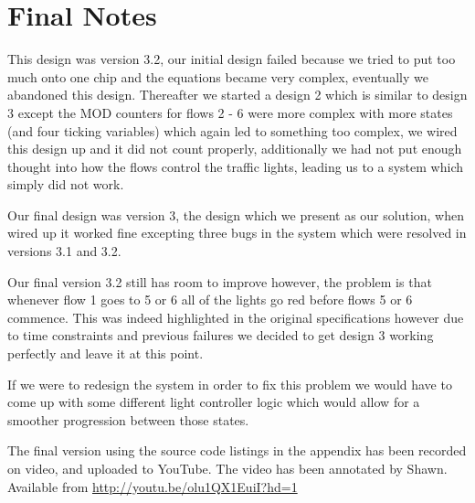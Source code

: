 \section{Final Notes}
This design was version 3.2, our initial design failed because we tried to put
too much onto one chip and the equations became very complex, eventually we
abandoned this design. Thereafter we started a design 2 which is similar to
design 3 except the MOD counters for flows 2 - 6 were more complex with more
states (and four ticking variables) which again led to something too complex,
we wired this design up and it did not count properly, additionally we had not
put enough thought into how the flows control the traffic lights, leading us to
a system which simply did not work. 

Our final design was version 3, the design which we present as our solution,
when wired up it worked fine excepting three bugs in the system which were
resolved in versions 3.1 and 3.2. 

Our final version 3.2 still has room to improve however, the problem is that
whenever flow 1 goes to 5 or 6 all of the lights go red before flows 5 or 6
commence. This was indeed highlighted in the original specifications however
due to time constraints and previous failures we decided to get design 3 working
perfectly and leave it at this point. 

If we were to redesign the system in order to fix this problem we would have to
come up with some different light controller logic which would allow for a
smoother progression between those states.

The final version using the source code listings in the appendix has been
recorded on video, and uploaded to YouTube. The video has been annotated by
Shawn. Available from \url{http://youtu.be/olu1QX1EuiI?hd=1}